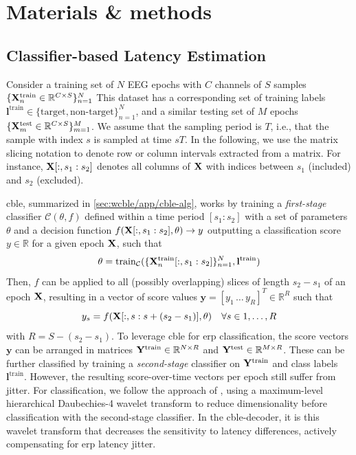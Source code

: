 \section{Materials \& methods}
\label{sec:wcble/methods}

\subsection{Classifier-based Latency Estimation}
\label{sec:wcble/methods/cble}

Consider a training set of $N$ EEG epochs with $C$ channels of $S$
samples $\{\mathbf{X}_n^\mathrm{train} \in \mathbb{R}^{C\times S}\}_{n=1}^N$
This dataset has a corresponding set of training labels $\mathbf{l^\mathrm{train}} \in \{\mathrm{target},
	\textrm{non-target}\}_{n=1}^N$, and a
similar testing set of $M$ epochs $\{\mathbf{X}_m^\mathrm{test} \in
	\mathbb{R}^{C\times S}\}_{m=1}^M$.
We assume that the sampling period is $T$, i.e., that the sample with index $s$ is sampled at time $sT$.
In the following, we use the matrix slicing notation to denote row or column intervals extracted from a matrix.
For instance, $\mathbf{X}[:,s_1:s_2]$ denotes all columns of $\mathbf{X}$ with indices between $s_1$ (included) and $s_2$ (excluded).

\Ac{cble}, summarized in \cref{sec:wcble/app/cble-alg}, works by training a
\textit{first-stage} classifier $\mathcal{C}(\theta,f)$
defined within a time period $[s_1:s_2]$ with a set of parameters $\theta$ and a
decision function $f(\mathbf{X}[:,s_1:s_2],\theta) \rightarrow
y$ outputting a classification score $y\in\mathbb{R}$ for a given epoch $\mathbf{X}$,
such that
\begin{equation}
  \theta = \mathrm{train}_\mathcal{C}(\{\mathbf{X}_n^\mathrm{train}[:,s_1:s_2]\}_{n=1}^N,\mathbf{l}^\mathrm{train})
  \label{eq:cble-train}
\end{equation}
Then,
$f$ can be applied to all (possibly overlapping) slices of length $s_2-s_1$ of
an epoch $\mathbf{X}$, resulting in a vector of score values
$\mathbf{y}=[y_1\,\ldots\,y_R]^T \in\mathbb{R}^R$ such that
\begin{equation}
  y_s = f(\mathbf{X}[:,s:s+(s_2-s_1)],\theta)\quad \forall s\in 1,\ldots,R
	\label{eq:score}
\end{equation}
with $R = S-(s_2-s_1)$.
To leverage \ac{cble} for \ac{erp} classification, the score vectors $\mathbf{y}$ can be
arranged in matrices $\mathbf{Y}^\mathrm{train}\in\mathbb{R}^{N\times R}$ and $\mathbf{Y}^\mathrm{test}\in\mathbb{R}^{M\times R}$.
These can be further classified by training a \textit{second-stage} classifier on
$\mathbf{Y}^\mathrm{train}$ and class labels $\mathbf{l}^\mathrm{train}$.
However, the resulting score-over-time vectors per epoch still suffer from jitter.
For classification, we follow the approach of \textcite{Mowla2017}, using a
maximum-level hierarchical Daubechies-4 wavelet transform to reduce
dimensionality before classification with the second-stage classifier.
In the \ac{cble}-decoder, it is this wavelet transform that decreases the sensitivity
to latency differences, actively compensating for \ac{erp} latency jitter.

